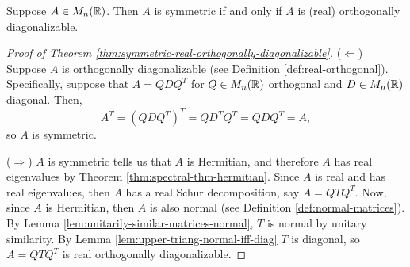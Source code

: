 \begin{theorem}
\label{thm:symmetric-real-orthogonally-diagonalizable}
Suppose $A \in M_n(\mathbb R)$. Then $A$ is symmetric if and only if $A$ is (real) orthogonally diagonalizable.
\end{theorem}

\begin{proof}[Proof of Theorem \ref{thm:symmetric-real-orthogonally-diagonalizable}]
($\Longleftarrow$) Suppose $A$ is orthogonally diagonalizable (see Definition \ref{def:real-orthogonal}). Specifically, suppose that $A = QDQ^T$ for $Q \in M_n(\mathbb R)$ orthogonal and $D \in M_n(\mathbb R)$ diagonal. Then,
$$
A^T = (QDQ^T)^T = QD^TQ^T = QDQ^T = A,
$$
so $A$ is symmetric.

($\Longrightarrow$) $A$ is symmetric tells us that $A$ is Hermitian, and therefore $A$ has real eigenvalues by Theorem \ref{thm:spectral-thm-hermitian}. Since $A$ is real and has real eigenvalues, then $A$ has a real Schur decomposition, say $A = QTQ^T$. Now, since $A$ is Hermitian, then $A$ is also normal (see Definition \ref{def:normal-matrices}). By Lemma \ref{lem:unitarily-similar-matrices-normal}, $T$ is normal by unitary similarity. By Lemma \ref{lem:upper-triang-normal-iff-diag} $T$ is diagonal, so $A = QTQ^T$ is real orthogonally diagonalizable.
\end{proof}